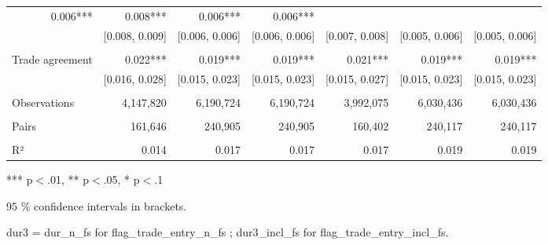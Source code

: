 \begin{table}[!h]
\begin{tabular}{lllllll}
  \multicolumn{1}{r}{0.006***} &
  \multicolumn{1}{r}{0.008***} &
  \multicolumn{1}{r}{0.006***} &
  \multicolumn{1}{r}{0.006***} \\
\multicolumn{1}{l}{} &
  \multicolumn{1}{|r}{[0.008,   0.009]} &
  \multicolumn{1}{r}{[0.006,   0.006]} &
  \multicolumn{1}{r}{[0.006,   0.006]} &
  \multicolumn{1}{r}{[0.007,   0.008]} &
  \multicolumn{1}{r}{[0.005,   0.006]} &
  \multicolumn{1}{r}{[0.005,   0.006]} \\
\multicolumn{1}{l}{} &
  \multicolumn{1}{|r}{} &
  \multicolumn{1}{r}{} &
  \multicolumn{1}{r}{} &
  \multicolumn{1}{r}{} &
  \multicolumn{1}{r}{} &
  \multicolumn{1}{r}{} \\
\multicolumn{1}{l}{Trade agreement} &
  \multicolumn{1}{|r}{0.022***} &
  \multicolumn{1}{r}{0.019***} &
  \multicolumn{1}{r}{0.019***} &
  \multicolumn{1}{r}{0.021***} &
  \multicolumn{1}{r}{0.019***} &
  \multicolumn{1}{r}{0.019***} \\
\multicolumn{1}{l}{} &
  \multicolumn{1}{|r}{[0.016,   0.028]} &
  \multicolumn{1}{r}{[0.015,   0.023]} &
  \multicolumn{1}{r}{[0.015,   0.023]} &
  \multicolumn{1}{r}{[0.015,   0.027]} &
  \multicolumn{1}{r}{[0.015,   0.023]} &
  \multicolumn{1}{r}{[0.015,   0.023]} \\
\multicolumn{1}{l}{} &
  \multicolumn{1}{|r}{} &
  \multicolumn{1}{r}{} &
  \multicolumn{1}{r}{} &
  \multicolumn{1}{r}{} &
  \multicolumn{1}{r}{} &
  \multicolumn{1}{r}{} \\
\multicolumn{1}{l}{Observations} &
  \multicolumn{1}{|r}{4,147,820} &
  \multicolumn{1}{r}{6,190,724} &
  \multicolumn{1}{r}{6,190,724} &
  \multicolumn{1}{r}{3,992,075} &
  \multicolumn{1}{r}{6,030,436} &
  \multicolumn{1}{r}{6,030,436} \\
\multicolumn{1}{l}{} &
  \multicolumn{1}{|r}{} &
  \multicolumn{1}{r}{} &
  \multicolumn{1}{r}{} &
  \multicolumn{1}{r}{} &
  \multicolumn{1}{r}{} &
  \multicolumn{1}{r}{} \\
\multicolumn{1}{l}{Pairs} &
  \multicolumn{1}{|r}{161,646} &
  \multicolumn{1}{r}{240,905} &
  \multicolumn{1}{r}{240,905} &
  \multicolumn{1}{r}{160,402} &
  \multicolumn{1}{r}{240,117} &
  \multicolumn{1}{r}{240,117} \\
\multicolumn{1}{l}{} &
  \multicolumn{1}{|r}{} &
  \multicolumn{1}{r}{} &
  \multicolumn{1}{r}{} &
  \multicolumn{1}{r}{} &
  \multicolumn{1}{r}{} &
  \multicolumn{1}{r}{} \\
\multicolumn{1}{l}{R²} &
  \multicolumn{1}{|r}{0.014} &
  \multicolumn{1}{r}{0.017} &
  \multicolumn{1}{r}{0.017} &
  \multicolumn{1}{r}{0.017} &
  \multicolumn{1}{r}{0.019} &
  \multicolumn{1}{r}{0.019} \\
\cline{1-7}
\end{tabular}

\footnotesize{
*** p$<$.01, ** p$<$.05, * p$<$.1

95 \% confidence intervals in brackets.

dur3 = dur\_n\_fs for flag\_trade\_entry\_n\_fs ; dur3\_incl\_fs for flag\_trade\_entry\_incl\_fs.
}
\end{table}

